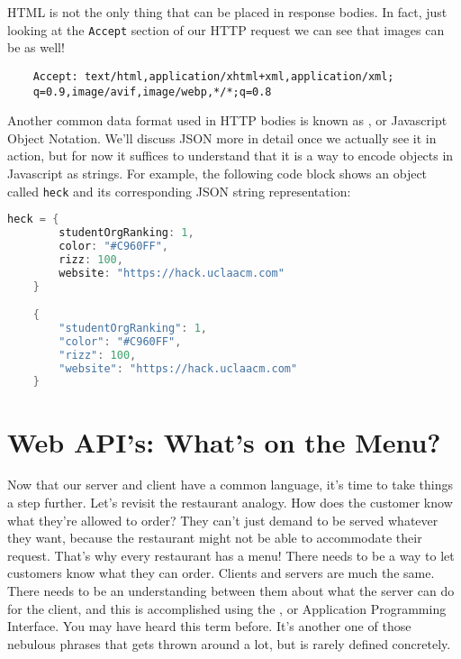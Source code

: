 HTML is not the only thing that can be placed in response bodies. In fact, just looking at the \texttt{Accept} section of our HTTP request we can see that images can be as well!

\begin{verbatim}
    Accept: text/html,application/xhtml+xml,application/xml;
    q=0.9,image/avif,image/webp,*/*;q=0.8
\end{verbatim}

Another common data format used in HTTP bodies is known as , or Javascript Object Notation. We'll discuss JSON more in detail once we actually see it in action, but for now it suffices to understand that it is a way to encode objects in Javascript as strings. For example, the following code block shows an object called \texttt{heck} and its corresponding JSON string representation:

\vspace{.5cm}

\begin{lstlisting}[language=Java]
    heck = {
        studentOrgRanking: 1,
        color: "#C960FF",
        rizz: 100,
        website: "https://hack.uclaacm.com"
    }

    {
        "studentOrgRanking": 1,
        "color": "#C960FF",
        "rizz": 100,
        "website": "https://hack.uclaacm.com"
    }
\end{lstlisting}


\section{Web API's: What's on the Menu?}

Now that our server and client have a common language, it's time to take things a step further. Let's revisit the restaurant analogy. How does the customer know what they're allowed to order? They can't just demand to be served whatever they want, because the restaurant might not be able to accommodate their request. That's why every restaurant has a menu! There needs to be a way to let customers know what they can order. Clients and servers are much the same. There needs to be an understanding between them about what the server can do for the client, and this is accomplished using the , or Application Programming Interface. You may have heard this term before. It's another one of those nebulous phrases that gets thrown around a lot, but is rarely defined concretely.

